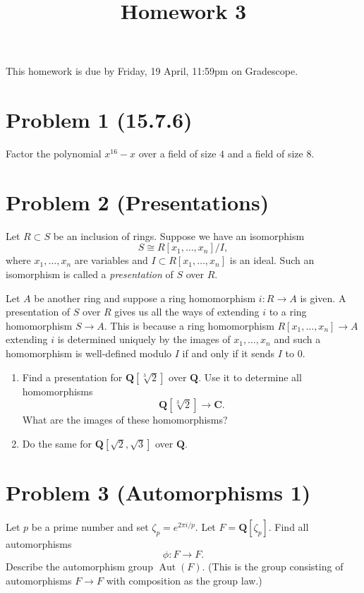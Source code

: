 \documentclass{amsart}
\date{}
\title{Homework 3}
\begin{document}
\maketitle
This homework is due by Friday, 19 April, 11:59pm on Gradescope.
\section{Problem 1 (15.7.6)}
\label{sec:org423a0ea}

Factor the polynomial \(x^{16}-x\) over a field of size \(4\) and a field of size \(8\).
\section{Problem 2 (Presentations)}
\label{sec:org16d6f67}

Let \(R \subset S\) be an inclusion of rings.
Suppose we have an isomorphism
\[ S \cong R[x_1, \dots, x_n]/I, \]
where \(x_1, \dots, x_n\) are variables and \(I \subset R[x_1, \dots, x_n]\) is an ideal.
Such an isomorphism is called a \emph{presentation} of \(S\) over \(R\).

Let \(A\) be another ring and suppose a ring homomorphism \(i \colon R \to A\) is given.
A presentation of \(S\) over \(R\) gives us all the ways of extending \(i\) to a ring homomorphism \(S \to A\).
This is because a ring homomorphism \(R[x_1,\dots,x_n] \to A\) extending \(i\) is determined uniquely by the images of \(x_1, \dots, x_n\) and such a homomorphism is well-defined modulo \(I\) if and only if it sends \(I\) to \(0\).

\begin{enumerate}
\item Find a presentation for \(\mathbf{Q}[\sqrt[3]{2}]\) over \(\mathbf{Q}\).
Use it to determine all homomorphisms
\[ \mathbf{Q}[\sqrt[3] 2] \to \mathbf{C}.\]
What are the images of these homomorphisms?

\item Do the same for \(\mathbf{Q}[\sqrt 2, \sqrt 3]\) over \(\mathbf{Q}\).
\end{enumerate}
\section{Problem 3 (Automorphisms 1)}
\label{sec:orgfd297c6}

Let \(p\) be a prime number and set \(\zeta_p = e^{2\pi i / p}\).
Let \(F = \mathbf{Q}[\zeta_p]\).
Find all automorphisms
\[ \phi \colon F \to F.\]
Describe the automorphism group \(\operatorname{Aut}(F)\).
(This is the group consisting of automorphisms \(F \to F\) with composition as the group law.)
\end{document}
